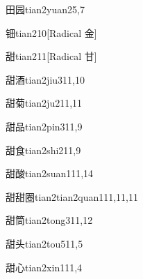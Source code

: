 \begin{verbete}{田园}{tian2yuan2}{5,7}
\end{verbete}

\begin{verbete}{钿}{tian2}{10}[Radical 金]
\end{verbete}

\begin{verbete}{甜}{tian2}{11}[Radical 甘]
\end{verbete}

\begin{verbete}{甜酒}{tian2jiu3}{11,10}
\end{verbete}

\begin{verbete}{甜菊}{tian2ju2}{11,11}
\end{verbete}

\begin{verbete}{甜品}{tian2pin3}{11,9}
\end{verbete}

\begin{verbete}{甜食}{tian2shi2}{11,9}
\end{verbete}

\begin{verbete}{甜酸}{tian2suan1}{11,14}
\end{verbete}

\begin{verbete}{甜甜圈}{tian2tian2quan1}{11,11,11}
\end{verbete}

\begin{verbete}{甜筒}{tian2tong3}{11,12}
\end{verbete}

\begin{verbete}{甜头}{tian2tou5}{11,5}
\end{verbete}

\begin{verbete}{甜心}{tian2xin1}{11,4}
\end{verbete}

